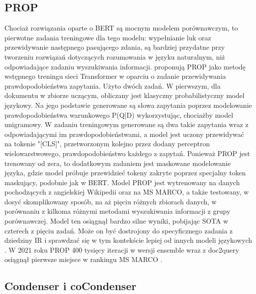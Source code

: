 \subsection{PROP}

Chociaż rozwiązania oparte o BERT są mocnym modelem porównawczym, to pierwotne
zadania treningowe dla tego modelu: wypełnianie luk oraz przewidywanie następnego pasującego
zdania, są bardziej przydatne przy tworzeniu rozwiązań dotyczących rozumowania w języku
naturalnym, niż odpowiadające zadaniu wyszukiwania informacji. \cite{ma2021prop} proponują PROP jako metodę wstępnego treningu sieci Transformer w oparciu o zadanie
przewidywania prawdopodobieństwa zapytania. Użyto dwóch zadań. W pierwszym, dla dokumentu w
zbiorze uczącym, obliczany jest klasyczny probabilistyczny model językowy. Na jego podstawie
generowane są słowa zapytania poprzez modelowanie prawdopodobieństwa warunkowego P(Q|D)
wykorzystując, chociażby model unigramowy. W zadaniu treningowym generowane są dwa takie
zapytania wraz z odpowiadającymi im prawdopodobieństwami, a model jest uczony przewidywać na
tokenie "[CLS]", przetworzonym kolejno przez dodany perceptron wielowarstwowego,
prawdopodobieństwo każdego z zapytań. Ponieważ PROP jest trenowany od zera, to dodatkowym
zadaniem jest maskowane modelowanie języka, gdzie model próbuje przewidzieć tokeny zakryte
poprzez specjalny token maskujący, podobnie jak w BERT. Model PROP jest wytrenowany na danych
pochodzących z angielskiej Wikipedii oraz na MS MARCO, a także testowany, w dosyć skomplikowany
sposób, na aż pięciu różnych zbiorach danych, w porównaniu z kilkoma różnymi metodami
wyszukiwania informacji z grupy porównawczej. Model ten osiągnął bardzo silne wyniki, pobijając
SOTA w czterech z pięciu zadań. Może on być dostrojony do specyficznego zadania z dziedziny IR i
sprawdzać się w tym kontekście lepiej od innych modeli językowych \autocite{ma2021prop}. W 2021 roku PROP 400 tysięcy
iteracji w wersji ensemble wraz z doc2query osiągnął pierwsze miejsce w rankingu MS MARCO \autocite{albertma-prop}.

\subsection{Condenser i coCondenser}


